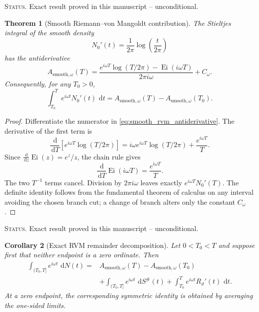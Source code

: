 \documentclass[11pt]{amsart}
\numberwithin{equation}{section}
\theoremstyle{plain}
\newtheorem{theorem}{Theorem}[section]
\newtheorem{corollary}[theorem]{Corollary}
\theoremstyle{definition}
\theoremstyle{remark}
\DeclareMathOperator{\Ei}{Ei}
\newcommand{\1}{\mathbf{1}}
\newcommand{\dd}{\,\mathrm{d}}
\newcommand{\statusnote}[1]{%
  \par\smallskip\noindent
  \begingroup\footnotesize\textsc{Status.} #1\endgroup
  \par\smallskip}
\begin{document}
\statusnote{Exact result proved in this manuscript -- unconditional.}
\begin{theorem}[Smooth Riemann--von Mangoldt contribution]
\label{thm:smooth_rvm_contribution}
The Stieltjes integral of the smooth density
\begin{equation}
N_0'(t)
=
\frac1{2\pi}\log\!\left(\frac{t}{2\pi}\right)
\label{eq:N0_derivative}
\end{equation}
has the antiderivative
\begin{equation}
\boxed{
A_{\mathrm{smooth},\omega}(T)
=
\frac{
 e^{i\omega T}\log(T/2\pi)-\Ei(i\omega T)
}{2\pi i\omega}
+C_\omega.
}
\label{eq:smooth_rvm_antiderivative}
\end{equation}
Consequently, for any \(T_0>0\),
\begin{equation}
\int_{T_0}^{T}e^{i\omega t}N_0'(t)\,\dd t
=
A_{\mathrm{smooth},\omega}(T)
-
A_{\mathrm{smooth},\omega}(T_0).
\label{eq:smooth_rvm_definite}
\end{equation}
\end{theorem}

\begin{proof}
Differentiate the numerator in \eqref{eq:smooth_rvm_antiderivative}.
The derivative of the first term is
\begin{equation}
\frac{\dd}{\dd T}
\left[e^{i\omega T}\log(T/2\pi)\right]
=
i\omega e^{i\omega T}\log(T/2\pi)
+
\frac{e^{i\omega T}}{T}.
\label{eq:smooth_derivative_first}
\end{equation}
Since \(\frac{\dd}{\dd z}\Ei(z)=e^z/z\), the chain rule gives
\begin{equation}
\frac{\dd}{\dd T}\Ei(i\omega T)
=
\frac{e^{i\omega T}}{T}.
\label{eq:smooth_derivative_Ei}
\end{equation}
The two \(T^{-1}\) terms cancel.  Division by \(2\pi i\omega\)
leaves exactly \(e^{i\omega T}N_0'(T)\).  The definite identity follows
from the fundamental theorem of calculus on any interval avoiding the
chosen branch cut; a change of branch alters only the constant
\(C_\omega\).
\end{proof}

\statusnote{Exact result proved in this manuscript -- unconditional.}
\begin{corollary}[Exact RVM remainder decomposition]
\label{cor:rvm_remainder_decomposition}
Let \(0<T_0<T\) and suppose first that neither endpoint is a zero
ordinate.  Then
\begin{align}
\int_{(T_0,T]}e^{i\omega t}\,\dd N(t)
={}&
A_{\mathrm{smooth},\omega}(T)
-
A_{\mathrm{smooth},\omega}(T_0)
\label{eq:rvm_remainder_decomposition_one}
\\
&+
\int_{(T_0,T]}e^{i\omega t}\,\dd S^{\#}(t)
+
\int_{T_0}^{T}e^{i\omega t}R_\vartheta'(t)\,\dd t.
\label{eq:rvm_remainder_decomposition_two}
\end{align}
At a zero endpoint, the corresponding symmetric identity is obtained by
averaging the one-sided limits.
\end{corollary}
\end{document}
